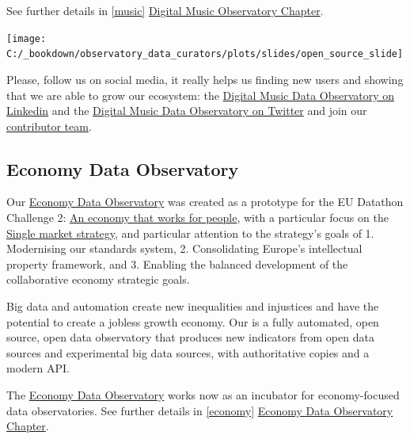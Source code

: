 \documentclass[
  a4paper,
  openany, a4paper, oneside]{book}
\begin{document}
See further details in \ref{music} \protect\hyperlink{music}{Digital Music Observatory Chapter}.

\begin{center}\texttt{[image: C:/\_bookdown/observatory\_data\_curators/plots/slides/open\_source\_slide]} \end{center}

Please, follow us on social media, it really helps us finding new users and showing that we are able to grow our ecosystem: the \href{https://www.linkedin.com/company/79286750/}{Digital Music Data Observatory on Linkedin} and the \href{https://twitter.com/DigitalMusicObs}{Digital Music Data Observatory on Twitter} and join our \href{https://music.dataobservatory.eu/\#contributors}{contributor team}.

\hypertarget{economy-data-observatory}{%
\subsection*{Economy Data Observatory}\label{economy-data-observatory}}

Our \href{https://economy.dataobservatory.eu/}{Economy Data Observatory} was created as a prototype for the EU Datathon Challenge 2: \href{https://ec.europa.eu/info/strategy/priorities-2019-2024/economy-works-people_en\#:~:text=Individuals\%20and\%20businesses\%20in\%20the,needs\%20of\%20the\%20EU's\%20citizens.}{An economy that works for people}, with a particular focus on the \href{https://ec.europa.eu/info/strategy/priorities-2019-2024/economy-works-people/internal-market_en}{Single market strategy}, and particular attention to the strategy's goals of 1. Modernising our standards system, 2. Consolidating Europe's intellectual property framework, and 3. Enabling the balanced development of the collaborative economy strategic goals.

Big data and automation create new inequalities and injustices and have the potential to create a jobless growth economy. Our is a fully automated, open source, open data observatory that produces new indicators from open data sources and experimental big data sources, with authoritative copies and a modern API.

The \href{https://economy.dataobservatory.eu/}{Economy Data Observatory} works now as an incubator for economy-focused data observatories. See further details in \ref{economy} \protect\hyperlink{economy}{Economy Data Observatory Chapter}.
\end{document}
